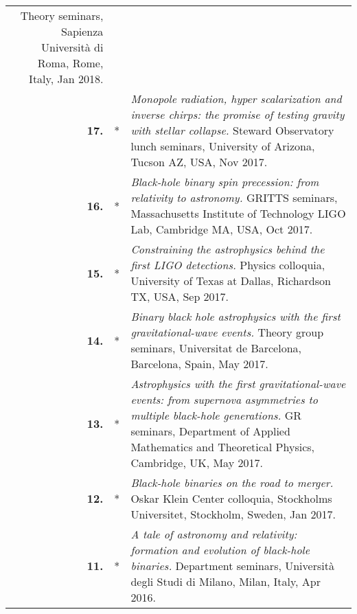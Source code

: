 {\begin{longtable}{rp{0.3cm}p{15.8cm}}
\newline{}
Theory seminars, Sapienza Universit\`a di Roma, Rome, Italy, Jan 2018.
\vspace{0.05cm}\\
%
\textbf{17.} & * & \textit{Monopole radiation, hyper scalarization and inverse chirps: the promise of testing gravity with stellar collapse.}
\newline{}
Steward Observatory lunch seminars, University of Arizona, Tucson AZ, USA, Nov 2017.
\vspace{0.05cm}\\
%
\textbf{16.} & * & \textit{Black-hole binary spin precession: from relativity to astronomy.}
\newline{}
GRITTS seminars, Massachusetts Institute of Technology LIGO Lab, Cambridge MA, USA, Oct 2017.
\vspace{0.05cm}\\
%
\textbf{15.} & * & \textit{Constraining the astrophysics behind the first LIGO detections.}
\newline{}
Physics colloquia, University of Texas at Dallas, Richardson TX, USA, Sep 2017.
\vspace{0.05cm}\\
%
\textbf{14.} & * & \textit{Binary black hole astrophysics with the first gravitational-wave events.}
\newline{}
Theory group seminars, Universitat de Barcelona, Barcelona, Spain, May 2017.
\vspace{0.05cm}\\
%
\textbf{13.} & * & \textit{Astrophysics with the first gravitational-wave events: from supernova asymmetries to multiple black-hole generations.}
\newline{}
GR seminars, Department of Applied Mathematics and Theoretical Physics, Cambridge, UK, May 2017.
\vspace{0.05cm}\\
%
\textbf{12.} & * & \textit{Black-hole binaries on the road to merger.}
\newline{}
Oskar Klein Center colloquia, Stockholms Universitet, Stockholm, Sweden, Jan 2017.
\vspace{0.05cm}\\
%
\textbf{11.} & * & \textit{A tale of astronomy and relativity: formation and evolution of black-hole binaries.}
\newline{}
Department seminars, Universit\`{a}  degli Studi di Milano, Milan, Italy, Apr 2016.
\vspace{0.05cm}\\

\end{longtable}}
